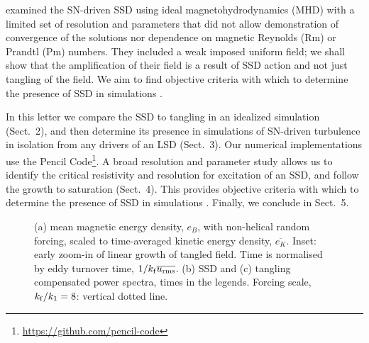 \documentclass[preprint2]{aastex63}
\newcommand\kf{k_{\rm f} }
\begin{document}
 examined the SN-driven SSD using ideal magnetohydrodynamics (MHD) with
 a limited set of resolution and parameters that did not allow
 demonstration of convergence of the solutions nor dependence on
 magnetic Reynolds (Rm) or Prandtl (Pm) numbers.
 They included a weak imposed uniform field; we shall show
 that the amplification of their field is a result
 of SSD action and not just tangling of the field.
 We aim to find objective criteria with which to determine the presence of SSD
 in simulations \citep[such as][]{Gent:2013b,GE20}.

In this letter we compare the SSD to tangling in an idealized simulation
(Sect.\ 2), and then determine its presence in simulations of SN-driven 
turbulence in isolation from any drivers of an LSD (Sect.\ 3). 
Our numerical implementations use the {\sc Pencil Code}\footnote{
\href{https://github.com/pencil-code}{https://github.com/pencil-code}}.
A broad resolution and parameter study allows us to identify the critical
resistivity and resolution for excitation of an SSD, and follow the growth to
saturation (Sect.\ 4).
This provides objective criteria with which to determine the presence of SSD
in simulations \citep[such as][]{Gent:2013b,GE20,SBADMN19}.
Finally, we conclude in Sect.\ 5.
\begin{figure*}
\caption{
 (a) mean magnetic energy density, $e_B$, with non-helical random forcing,
 scaled to time-averaged kinetic energy density, $\overline{e_K}$.
 Inset: early zoom-in of linear growth of tangled field.
 Time is normalised by eddy turnover time, $1/\kf \overline{u_{\rm rms}}$.
 (b) SSD and (c) tangling compensated power spectra, times in the legends.
  Forcing scale, $\kf/k_1=8$: vertical dotted line.
\label{fig:tangling}}
\end{figure*}
\end{document}
